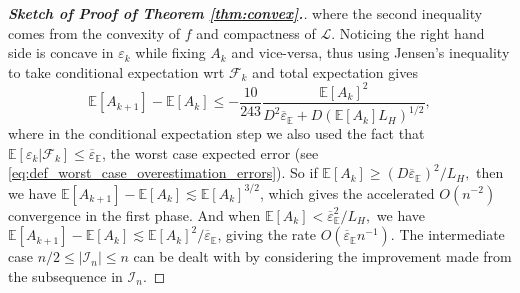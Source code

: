 \documentclass[11pt]{amsart}
\theoremstyle{plain}
\theoremstyle{definition}
\theoremstyle{remark}
\def\E{\mathbb{E}}
\def\eps{\varepsilon}
\def\param{\boldsymbol{\theta}}
\newcommand{\commHL}[1]{{\textcolor{blue}{#1}}}
\begin{document}
\begin{proof}[\textbf{\textit{Sketch of Proof of Theorem \ref{thm:convex}.}}]
where the second inequality comes from the convexity of $f$ and compactness of $\mathcal{L}.$
Noticing the right hand side is concave in $\eps_k$ while fixing $A_k$ and vice-versa, thus using Jensen's inequality to take conditional expectation wrt $\mathcal{F}_k$ and total expectation gives
\[
\E[A_{k+1}]-\E[A_{k}]\leq-\frac{10}{243}\frac{\E[A_k]^2}{D^2\overline{\eps}_{\E}+D(\E[A_k]L_H)^{1/2}},
\]
where in the conditional expectation step we also used the fact that $\E[\eps_k|\mathcal{F}_k]\leq \overline{\eps}_{\E}$, the worst case expected error (see \eqref{eq:def_worst_case_overestimation_errors}).
So if $\E[A_k]\geq (D\overline{\eps}_{\E})^2/L_H,$ then we have $\E[A_{k+1}]-\E[A_{k}]\lesssim \E[A_k]^{3/2}$, which gives the accelerated $O(n^{-2})$ convergence in the first phase. And when $\E[A_k]< \overline{\eps}_{\E}^2/L_H,$ we have $\E[A_{k+1}]-\E[A_{k}]\lesssim \E[A_k]^{2}/\overline{\eps}_{\E}$,  giving the rate $O(\overline{\eps}_{\E}n^{-1})$. The intermediate case $n/2\leq |\mathcal{I}_n|\leq n$ can be dealt with by considering the improvement made from the subsequence in $\mathcal{I}_n.$
\end{proof}
\end{document}
